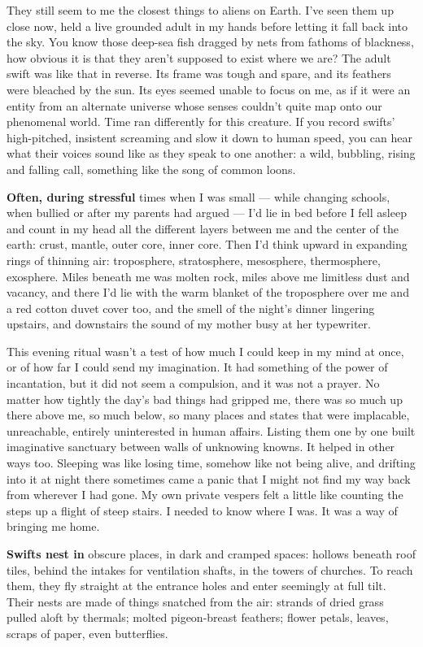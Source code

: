They still seem to me the closest things to aliens on Earth. I've seen
them up close now, held a live grounded adult in my hands before letting
it fall back into the sky. You know those deep-sea fish dragged by nets
from fathoms of blackness, how obvious it is that they aren't supposed
to exist where we are? The adult swift was like that in reverse. Its
frame was tough and spare, and its feathers were bleached by the sun.
Its eyes seemed unable to focus on me, as if it were an entity from an
alternate universe whose senses couldn't quite map onto our phenomenal
world. Time ran differently for this creature. If you record swifts'
high-pitched, insistent screaming and slow it down to human speed, you
can hear what their voices sound like as they speak to one another: a
wild, bubbling, rising and falling call, something like the song of
common loons.

\textbf{Often, during stressful} times when I was small --- while
changing schools, when bullied or after my parents had argued --- I'd
lie in bed before I fell asleep and count in my head all the different
layers between me and the center of the earth: crust, mantle, outer
core, inner core. Then I'd think upward in expanding rings of thinning
air: troposphere, stratosphere, mesosphere, thermosphere, exosphere.
Miles beneath me was molten rock, miles above me limitless dust and
vacancy, and there I'd lie with the warm blanket of the troposphere over
me and a red cotton duvet cover too, and the smell of the night's dinner
lingering upstairs, and downstairs the sound of my mother busy at her
typewriter.

This evening ritual wasn't a test of how much I could keep in my mind at
once, or of how far I could send my imagination. It had something of the
power of incantation, but it did not seem a compulsion, and it was not a
prayer. No matter how tightly the day's bad things had gripped me, there
was so much up there above me, so much below, so many places and states
that were implacable, unreachable, entirely uninterested in human
affairs. Listing them one by one built imaginative sanctuary between
walls of unknowing knowns. It helped in other ways too. Sleeping was
like losing time, somehow like not being alive, and drifting into it at
night there sometimes came a panic that I might not find my way back
from wherever I had gone. My own private vespers felt a little like
counting the steps up a flight of steep stairs. I needed to know where I
was. It was a way of bringing me home.

\textbf{Swifts nest in} obscure places, in dark and cramped spaces:
hollows beneath roof tiles, behind the intakes for ventilation shafts,
in the towers of churches. To reach them, they fly straight at the
entrance holes and enter seemingly at full tilt. Their nests are made of
things snatched from the air: strands of dried grass pulled aloft by
thermals; molted pigeon-breast feathers; flower petals, leaves, scraps
of paper, even butterflies.

